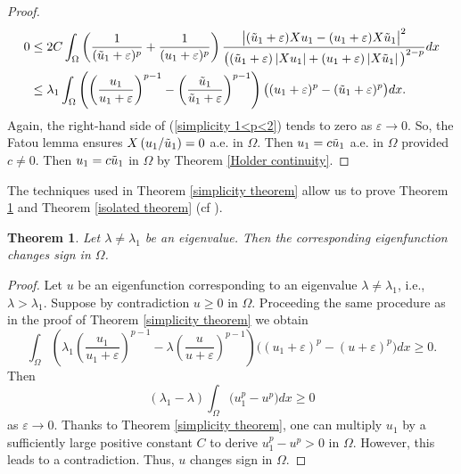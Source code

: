 \documentclass[a4paper,12pt,reqno]{amsart}
\renewcommand\eqref[1]{(\ref{#1})} %
\numberwithin{equation}{section}
\theoremstyle{plain}
\newtheorem{theorem}{Theorem}[section]
\theoremstyle{definition}
\begin{document}
\begin{proof}
\begin{equation}
\begin{aligned}
0 & \leq 2C \int_{\Omega}\left(\frac{1}{(\Tilde{u}_{1}+\varepsilon)^{p}}+\frac{1}{(u_{1}+\varepsilon)^{p}}\right) \frac{\big|(\Tilde{u}_{1}+\varepsilon) X u_{1}-(u_{1}+\varepsilon) X \Tilde{u}_{1}\big|^{2}}{\big((\Tilde{u}_{1}+\varepsilon)\left|X u_{1}\right|+(u_{1}+\varepsilon)\left|X \Tilde{u}_{1}\right|\big)^{2-p}} d x \\
& \leq\lambda_{1} \int_{\Omega}\left(\left(\frac{u_{1}}{u_{1}+\varepsilon}\right)^{p-1}-\left(\frac{\Tilde{u}_{1}}{\Tilde{u}_{1}+\varepsilon}\right)^{p-1}\right)\big((u_{1}+\varepsilon)^{p}-(\Tilde{u}_{1}+\varepsilon)^{p}\big) d x.
\end{aligned}    
\end{equation}
Again, the right-hand side of \eqref{simplicity 1<p<2} tends to zero as $\varepsilon\to 0$. So, the Fatou lemma ensures $X\left(u_{1}/\Tilde{u}_{1}\right)=0$ a.e. in $\Omega$. Then $u_{1}=c\Tilde{u}_{1}$ a.e. in $\Omega$ provided $c\neq 0$. Then $u_{1}=c\Tilde{u}_{1}$ in $\Omega$ by Theorem \ref{Holder continuity}.
\end{proof}

The techniques used in Theorem \ref{simplicity theorem} allow us to prove Theorem \ref{change sign theorem} and Theorem \ref{isolated theorem} (cf \cite{AL1987}).
\begin{theorem}\label{change sign theorem}
Let $\lambda\neq \lambda_{1}$ be an eigenvalue. Then the corresponding eigenfunction changes sign in $\Omega$.
\end{theorem}
\begin{proof}
Let $u$ be an eigenfunction corresponding to an eigenvalue $\lambda\neq\lambda_{1}$, i.e., $\lambda> \lambda_{1}$. Suppose by contradiction $u\geq 0$ in $\Omega$. Proceeding the same procedure as in the proof of Theorem \ref{simplicity theorem} we obtain
\begin{equation*}
\int_{\Omega}\left(\lambda_{1}\left(\frac{u_{1}}{u_{1}+\varepsilon}\right)^{p-1}-\lambda\left(\frac{u}{u+\varepsilon}\right)^{p-1}\right)\big((u_{1}+\varepsilon)^{p}-(u+\varepsilon)^{p}\big) d x \geq 0.    
\end{equation*}
Then
\begin{equation*}
\left(\lambda_{1}-\lambda\right)\int_{\Omega}\big(u_{1}^{p}-u^{p}\big) d x \geq 0  
\end{equation*}
as $\varepsilon\to 0$. Thanks to Theorem \ref{simplicity theorem}, one can multiply $u_{1}$ by a sufficiently large positive constant $C$ to derive $u_{1}^{p}-u^{p}>0$ in $\Omega$. However, this leads to a contradiction. Thus, $u$ changes sign in $\Omega$.
\end{proof}
\end{document}
